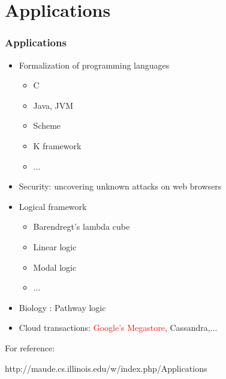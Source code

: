 \documentclass{beamer}
\begin{document}
\section{Applications}
\begin{frame}
    \frametitle{Applications}
    \begin{itemize}
        \item Formalization of programming languages 
        \begin{itemize}
            \item C
            \item Java, JVM
            \item Scheme
            \item K framework
            \item ...
        \end{itemize}
        \item Security: uncovering unknown attacks on web browsers 
        \item Logical framework 
        \begin{itemize}
            \item Barendregt's lambda cube 
            \item Linear logic 
            \item Modal logic
            \item ...
        \end{itemize}
        \item Biology : Pathway logic 
        \item Cloud transactions: \textcolor{red}{Google's Megastore}, Cassandra,...
    \end{itemize}

    For reference:

    http://maude.cs.illinois.edu/w/index.php/Applications
\end{frame}
\end{document}
